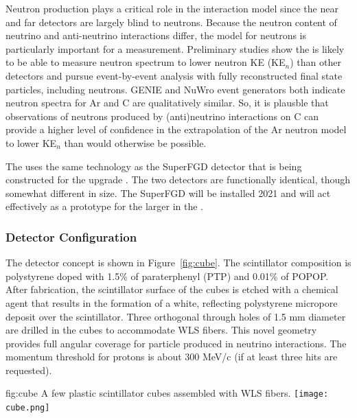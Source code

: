 Neutron production plays a critical role in the interaction model since the near and far  detectors are largely blind to neutrons. Because the neutron content of neutrino and anti-neutrino interactions differ, the model for neutrons is particularly important for a  measurement.  Preliminary studies show the  is likely to be able to measure neutron spectrum to lower neutron KE (KE$_{n}$) than other detectors and pursue event-by-event analysis with fully reconstructed final state particles, including neutrons.  GENIE and NuWro event generators both indicate neutron spectra for Ar and C are qualitatively similar.  So, it is plausble that observations of neutrons produced by (anti)neutrino interactions on C can provide a higher level of confidence in the extrapolation of the Ar neutron model to lower KE$_{n}$ than would otherwise be possible.

The  uses the same technology as the SuperFGD detector that is being constructed for the   upgrade \cite{Abe:2019whr}.  The two detectors are functionally identical, though somewhat different in size.  The SuperFGD will be installed 2021 and will act effectively as a prototype for the larger  in the   . 


\subsubsection{Detector Configuration}

The  detector concept is shown in Figure~\ref{fig:cube}.
The scintillator composition is polystyrene doped with 1.5\% of paraterphenyl (PTP) and 0.01\% of POPOP. After fabrication, the scintillator surface of the cubes is etched with a chemical agent that results in the formation of a white, reflecting polystyrene micropore deposit over the scintillator. Three orthogonal through holes of 1.5 mm diameter are drilled in the cubes to accommodate WLS fibers. 
This novel geometry provides full angular coverage for particle produced in neutrino interactions.  The momentum threshold for protons is about 300 MeV/c (if at least three hits are requested).


\begin{dunefigure}{fig:cube}
{A few plastic scintillator cubes assembled with WLS fibers.}
  \texttt{[image: cube.png]}
\end{dunefigure}

